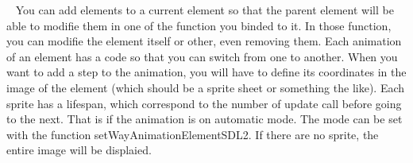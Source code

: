\begin{DoxyItemize}
~\newline
 You can add elements to a current element so that the parent element will be able to modifie them in one of the function you binded to it. In those function, you can modifie the element itself or other, even removing them. Each animation of an element has a code so that you can switch from one to another. When you want to add a step to the animation, you will have to define its coordinates in the image of the element (which should be a sprite sheet or something the like). Each sprite has a lifespan, which correspond to the number of update call before going to the next. That is if the animation is on \textquotesingle{}automatic\textquotesingle{} mode. The mode can be set with the function set\+Way\+Animation\+Element\+S\+D\+L2. If there are no sprite, the entire image will be displaied. ~\newline
~\newline
 
\end{DoxyItemize}